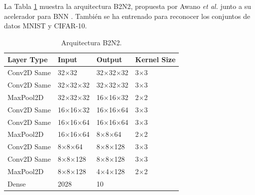 La Tabla \ref{tab:b2n2_model} muestra la arquitectura B2N2, propuesta por Awano \emph{et al.} junto a su acelerador para BNN \cite{bnn_clt_approx}. También se ha entrenado para reconocer los conjuntos de datos MNIST y CIFAR-10.

\begin{table}[h]
    \centering
    \caption{Arquitectura B2N2.}
    \label{tab:b2n2_model}
    \begin{tabular}{llll}
    \hline
    \textbf{Layer Type} & \textbf{Input} & \textbf{Output} & \textbf{Kernel Size}\\ \hline
    Conv2D Same & 32$\times$32 & 32$\times$32$\times$32 & 3$\times$3 \\
    Conv2D Same & 32$\times$32$\times$32 & 32$\times$32$\times$32 & 3$\times$3 \\
    MaxPool2D & 32$\times$32$\times$32 & 16$\times$16$\times$32 & 2$\times$2 \\
    Conv2D Same & 16$\times$16$\times$32 & 16$\times$16$\times$64 & 3$\times$3 \\
    Conv2D Same & 16$\times$16$\times$64 & 16$\times$16$\times$64 & 3$\times$3 \\
    MaxPool2D & 16$\times$16$\times$64 & 8$\times$8$\times$64 & 2$\times$2 \\
    Conv2D Same & 8$\times$8$\times$64 & 8$\times$8$\times$128 & 3$\times$3 \\
    Conv2D Same & 8$\times$8$\times$128 & 8$\times$8$\times$128 & 3$\times$3 \\
    MaxPool2D & 8$\times$8$\times$128 & 4$\times$4$\times$128 & 2$\times$2 \\
    Dense & 2028 & 10 & \\ \hline
    \end{tabular}
\end{table}
